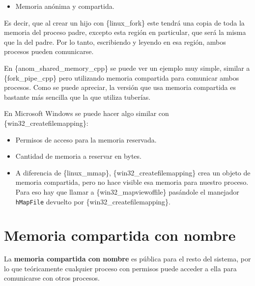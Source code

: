 \begin{itemize}
\item
  Memoria anónima y compartida.
\end{itemize}

Es decir, que al crear un hijo con \{linux\_fork\} este tendrá una copia
de toda la memoria del proceso padre, excepto esta región en particular,
que será la misma que la del padre. Por lo tanto, escribiendo y leyendo
en esa región, ambos procesos pueden comunicarse.

En \{anom\_shared\_memory\_cpp\} se puede ver un ejemplo muy simple,
similar a \{fork\_pipe\_cpp\} pero utilizando memoria compartida para
comunicar ambos procesos. Como se puede apreciar, la versión que usa
memoria compartida es bastante más sencilla que la que utiliza tuberías.

En Microsoft Windows se puede hacer algo similar con
\{win32\_createfilemapping\}:

\begin{Shaded}
\begin{Highlighting}[]
\OperatorTok{=}\OperatorTok{(} 
\OperatorTok{,}
\OperatorTok{,}
\OperatorTok{,} 
    \OperatorTok{,}
\OperatorTok{,}         
\OperatorTok{);}
\end{Highlighting}
\end{Shaded}

\begin{itemize}
\item
  Permisos de acceso para la memoria reservada.
\item
  Cantidad de memoria a reservar en bytes.
\item
  A diferencia de \{linux\_mmap\}, \{win32\_createfilemapping\} crea un
  objeto de memoria compartida, pero no hace visible esa memoria para
  nuestro proceso. Para eso hay que llamar a \{win32\_mapviewoffile\}
  pasándole el manejador \texttt{hMapFile} devuelto por
  \{win32\_createfilemapping\}.
\end{itemize}

\section{Memoria compartida con
nombre}\label{_memoria_compartida_con_nombre}

La \textbf{memoria compartida con nombre}{} es pública para el resto del
sistema, por lo que teóricamente cualquier proceso con permisos puede
acceder a ella para comunicarse con otros procesos.

